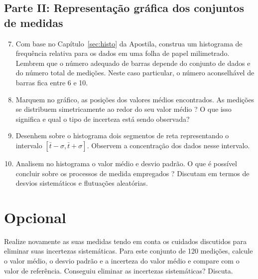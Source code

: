 \subsection*{Parte II:  Representação gráfica dos conjuntos de medidas}

\begin{enumerate}
\setcounter{enumi}{6}

\item Com base no Capítulo~\ref{sec:histo} da Apostila, construa um histograma de frequência relativa para os dados em uma  folha de papel milimetrado. Lembrem que o número adequado de barras depende do conjunto de dados e do número total de medições. Neste caso particular, o número aconselhável de barras fica entre 6 e 10. 
 
\item Marquem no gráfico, as posições dos valores médios encontrados. As medições se distribuem simetricamente ao redor do seu valor médio ? O que isso significa e qual o tipo de incerteza está sendo observada?

\item Desenhem sobre o histograma dois segmentos de reta representando o intervalo $[\bar t-\sigma, \bar t+\sigma]$. Observem a concentração dos dados nesse intervalo. 

\item Analisem no histograma o valor médio e desvio padrão.  O que é possível concluir sobre os processos de medida empregados ? Discutam em termos de desvios sistemáticos e flutuações aleatórias. 

\end{enumerate}


\section{Opcional} 
Realize novamente as suas medidas tendo em conta os cuidados discutidos para eliminar suas incertezas sistemáticas. Para este conjunto de 120 medições, calcule o valor médio, o desvio padrão e a incerteza do valor médio e compare com o valor de referência. Conseguiu eliminar as incertezas sistemáticas?  Discuta. 


  
